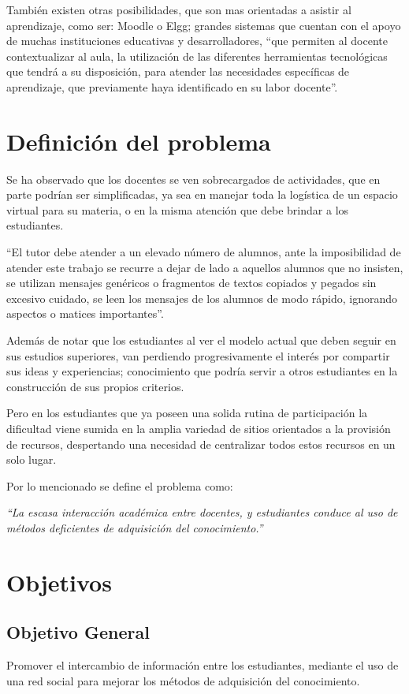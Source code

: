 También existen otras posibilidades, que son mas orientadas a asistir al
aprendizaje, como ser: Moodle o Elgg; grandes sistemas que cuentan con el apoyo
de muchas instituciones educativas y desarrolladores, “que permiten al docente
contextualizar al aula, la utilización de las diferentes herramientas
tecnológicas que tendrá a su disposición, para atender las necesidades
específicas de aprendizaje, que previamente haya identificado en su labor
docente”\cite{Gonzalez}.

\section{Definición del problema}
Se ha observado que los docentes se ven sobrecargados de actividades, que en
parte podrían ser simplificadas, ya sea en manejar toda la logística de un
espacio virtual para su materia, o en la misma atención que debe brindar a los
estudiantes.

“El tutor debe atender a un elevado número de alumnos, ante la imposibilidad de
atender este trabajo se recurre a dejar de lado a aquellos alumnos que no
insisten, se utilizan mensajes genéricos o fragmentos de textos copiados y
pegados sin excesivo cuidado, se leen los mensajes de los alumnos de modo
rápido, ignorando aspectos o matices importantes”\cite{Bartolome}.

Además de notar que los estudiantes al ver el modelo actual que deben seguir en
sus estudios superiores, van perdiendo progresivamente el interés por compartir
sus ideas y experiencias; conocimiento que podría servir a otros estudiantes en
la construcción de sus propios criterios.

Pero en los estudiantes que ya poseen una solida rutina de participación la
dificultad viene sumida en la amplia variedad de sitios orientados a la
provisión de recursos, despertando una necesidad de centralizar todos estos
recursos en un solo lugar.

Por lo mencionado se define el problema como:

\emph{“La escasa interacción académica entre docentes, y estudiantes conduce al
uso de métodos deficientes de adquisición del conocimiento.”}

\section{Objetivos}

\subsection{Objetivo General}
Promover el intercambio de información entre los estudiantes, mediante el uso
de una red social para mejorar los métodos de adquisición del conocimiento.


